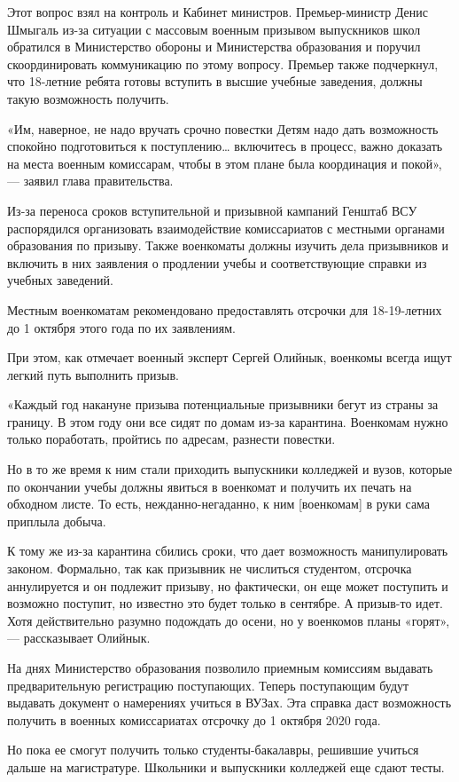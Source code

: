 Этот вопрос взял на контроль и Кабинет министров. Премьер-министр Денис Шмыгаль
из-за ситуации с массовым военным призывом выпускников школ обратился в
Министерство обороны и Министерства образования и поручил скоординировать
коммуникацию по этому вопросу. Премьер также подчеркнул, что 18-летние ребята
готовы вступить в высшие учебные заведения, должны такую возможность получить. 

«Им, наверное, не надо вручать срочно повестки Детям надо дать возможность
спокойно подготовиться к поступлению… включитесь в процесс, важно доказать на
места военным комиссарам, чтобы в этом плане была координация и покой», —
заявил глава правительства. 

Из-за переноса сроков вступительной и призывной кампаний Генштаб ВСУ
распорядился организовать взаимодействие комиссариатов с местными органами
образования по призыву. Также военкоматы должны изучить дела призывников и
включить в них заявления о продлении учебы и соответствующие справки из учебных
заведений. 

Местным военкоматам рекомендовано предоставлять отсрочки для 18-19-летних до 1
октября этого года по их заявлениям. 

При этом, как отмечает военный эксперт Сергей Олийнык, военкомы всегда ищут
легкий путь выполнить призыв. 

«Каждый год накануне призыва потенциальные призывники бегут из страны за
границу. В этом году они все сидят по домам из-за карантина. Военкомам нужно
только поработать, пройтись по адресам, разнести повестки. 

Но в то же время к ним стали приходить выпускники колледжей и вузов, которые по
окончании учебы должны явиться в военкомат и получить их печать на обходном
листе. То есть, нежданно-негаданно, к ним [военкомам] в руки сама приплыла
добыча. 

К тому же из-за карантина сбились сроки, что дает возможность манипулировать
законом. Формально, так как призывник не числиться студентом, отсрочка
аннулируется и он подлежит призыву, но фактически, он еще может поступить и
возможно поступит, но известно это будет только в сентябре. А призыв-то идет.
Хотя действительно разумно подождать до осени, но у военкомов планы «горят», —
рассказывает Олийнык. 

На днях Министерство образования позволило приемным комиссиям выдавать
предварительную регистрацию поступающих. Теперь поступающим будут выдавать
документ о намерениях учиться в ВУЗах. Эта справка даст возможность получить в
военных комиссариатах отсрочку до 1 октября 2020 года. 

Но пока ее смогут получить только студенты-бакалавры, решившие учиться дальше
на магистратуре. Школьники и выпускники колледжей еще сдают тесты.

